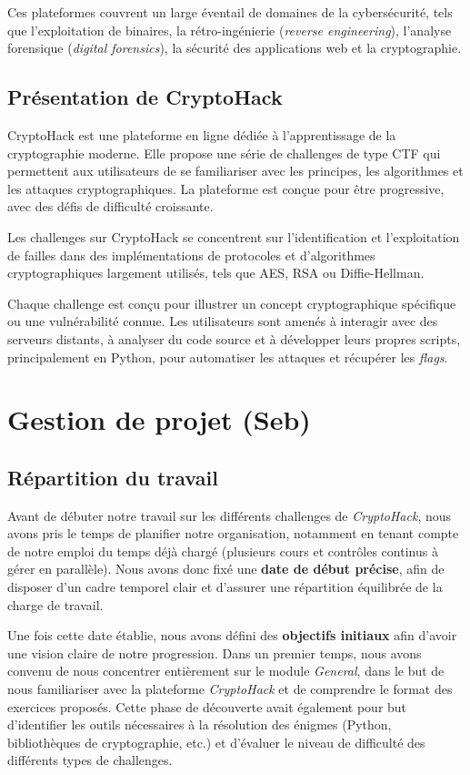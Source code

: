 \documentclass[12pt, a4paper]{article}
\begin{document}
    Ces plateformes couvrent un large éventail de domaines de la cybersécurité,
    tels que l'exploitation de binaires, la rétro-ingénierie (\textit{reverse
    engineering}), l'analyse forensique (\textit{digital forensics}), la
    sécurité des applications web et la cryptographie.

    \subsection{Présentation de CryptoHack}
    CryptoHack est une plateforme en ligne dédiée à l'apprentissage de la
    cryptographie moderne. Elle propose une série de challenges de type CTF qui
    permettent aux utilisateurs de se familiariser avec les principes, les
    algorithmes et les attaques cryptographiques. La plateforme est conçue pour
    être progressive, avec des défis de difficulté croissante.

    Les challenges sur CryptoHack se concentrent sur l'identification et
    l'exploitation de failles dans des implémentations de protocoles et
    d'algorithmes cryptographiques largement utilisés, tels que AES, RSA ou
    Diffie-Hellman.

    Chaque challenge est conçu pour illustrer un concept cryptographique
    spécifique ou une vulnérabilité connue. Les utilisateurs sont amenés à
    interagir avec des serveurs distants, à analyser du code source et à
    développer leurs propres scripts, principalement en Python, pour automatiser
    les attaques et récupérer les \textit{flags}.

    \section{Gestion de projet (Seb)}
    \subsection{Répartition du travail}
    Avant de débuter notre travail sur les différents challenges de
    \textit{CryptoHack}, nous avons pris le temps de planifier notre
    organisation, notamment en tenant compte de notre emploi du temps déjà
    chargé (plusieurs cours et contrôles continus à gérer en parallèle). Nous
    avons donc fixé une \textbf{date de début précise}, afin de disposer d’un
    cadre temporel clair et d’assurer une répartition équilibrée de la charge
    de travail.

    Une fois cette date établie, nous avons défini des \textbf{objectifs
    initiaux} afin d’avoir une vision claire de notre progression. Dans un
    premier temps, nous avons convenu de nous concentrer entièrement sur le
    module \textit{General}, dans le but de nous familiariser avec la
    plateforme \textit{CryptoHack} et de comprendre le format des exercices
    proposés. Cette phase de découverte avait également pour but d’identifier
    les outils nécessaires à la résolution des énigmes (Python, bibliothèques
    de cryptographie, etc.) et d’évaluer le niveau de difficulté des différents
    types de challenges.
\end{document}
